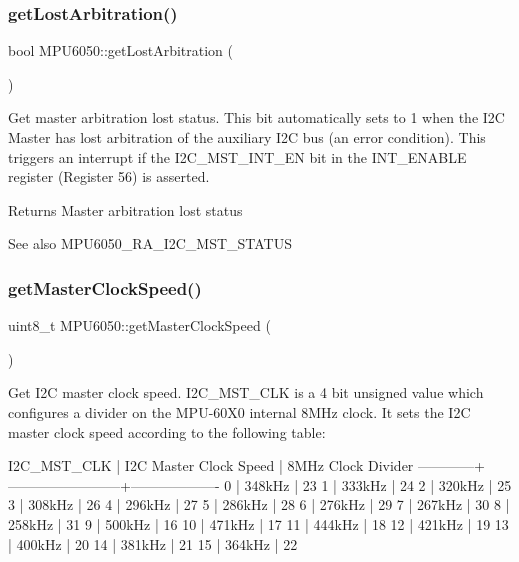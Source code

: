 \subsubsection{\texorpdfstring{getLostArbitration()}{getLostArbitration()}}
{\footnotesize\ttfamily bool M\+P\+U6050\+::get\+Lost\+Arbitration (\begin{DoxyParamCaption}{ }\end{DoxyParamCaption})}

Get master arbitration lost status. This bit automatically sets to 1 when the I2C Master has lost arbitration of the auxiliary I2C bus (an error condition). This triggers an interrupt if the I2\+C\+\_\+\+M\+S\+T\+\_\+\+I\+N\+T\+\_\+\+EN bit in the I\+N\+T\+\_\+\+E\+N\+A\+B\+LE register (Register 56) is asserted. \begin{DoxyReturn}{Returns}
Master arbitration lost status 
\end{DoxyReturn}
\begin{DoxySeeAlso}{See also}
M\+P\+U6050\+\_\+\+R\+A\+\_\+\+I2\+C\+\_\+\+M\+S\+T\+\_\+\+S\+T\+A\+T\+US 
\end{DoxySeeAlso}
\mbox{\label{class_m_p_u6050_a4cda448ef5c5736bd14188947342d636}} 
\subsubsection{\texorpdfstring{getMasterClockSpeed()}{getMasterClockSpeed()}}
{\footnotesize\ttfamily uint8\+\_\+t M\+P\+U6050\+::get\+Master\+Clock\+Speed (\begin{DoxyParamCaption}{ }\end{DoxyParamCaption})}

Get I2C master clock speed. I2\+C\+\_\+\+M\+S\+T\+\_\+\+C\+LK is a 4 bit unsigned value which configures a divider on the M\+P\+U-\/60\+X0 internal 8M\+Hz clock. It sets the I2C master clock speed according to the following table\+:


\begin{DoxyPre}
I2C\_MST\_CLK | I2C Master Clock Speed | 8MHz Clock Divider
------------+------------------------+-------------------
0           | 348kHz                 | 23
1           | 333kHz                 | 24
2           | 320kHz                 | 25
3           | 308kHz                 | 26
4           | 296kHz                 | 27
5           | 286kHz                 | 28
6           | 276kHz                 | 29
7           | 267kHz                 | 30
8           | 258kHz                 | 31
9           | 500kHz                 | 16
10          | 471kHz                 | 17
11          | 444kHz                 | 18
12          | 421kHz                 | 19
13          | 400kHz                 | 20
14          | 381kHz                 | 21
15          | 364kHz                 | 22
\end{DoxyPre}


